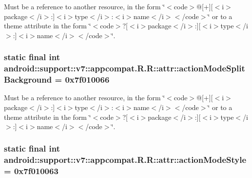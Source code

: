 Must be a reference to another resource, in the form \char`\"{}$<$code$>$@\mbox{[}+\mbox{]}\mbox{[}$<$i$>$package$<$/i$>$:\mbox{]}$<$i$>$type$<$/i$>$:$<$i$>$name$<$/i$>$$<$/code$>$\char`\"{} or to a theme attribute in the form \char`\"{}$<$code$>$?\mbox{[}$<$i$>$package$<$/i$>$:\mbox{]}\mbox{[}$<$i$>$type$<$/i$>$:\mbox{]}$<$i$>$name$<$/i$>$$<$/code$>$\char`\"{}. \hypertarget{classandroid_1_1support_1_1v7_1_1appcompat_1_1_r_1_1attr_db187c15298c9c64fd1d8e275b231a8e}{
\subsubsection[{actionModeSplitBackground}]{\setlength{\rightskip}{0pt plus 5cm}static final int android::support::v7::appcompat.R.R::attr::actionModeSplitBackground = 0x7f010066}}
\label{classandroid_1_1support_1_1v7_1_1appcompat_1_1_r_1_1attr_db187c15298c9c64fd1d8e275b231a8e}


Must be a reference to another resource, in the form \char`\"{}$<$code$>$@\mbox{[}+\mbox{]}\mbox{[}$<$i$>$package$<$/i$>$:\mbox{]}$<$i$>$type$<$/i$>$:$<$i$>$name$<$/i$>$$<$/code$>$\char`\"{} or to a theme attribute in the form \char`\"{}$<$code$>$?\mbox{[}$<$i$>$package$<$/i$>$:\mbox{]}\mbox{[}$<$i$>$type$<$/i$>$:\mbox{]}$<$i$>$name$<$/i$>$$<$/code$>$\char`\"{}. \hypertarget{classandroid_1_1support_1_1v7_1_1appcompat_1_1_r_1_1attr_74c4d5e912157068ec57c3e16d855f80}{
\subsubsection[{actionModeStyle}]{\setlength{\rightskip}{0pt plus 5cm}static final int android::support::v7::appcompat.R.R::attr::actionModeStyle = 0x7f010063}}
\label{classandroid_1_1support_1_1v7_1_1appcompat_1_1_r_1_1attr_74c4d5e912157068ec57c3e16d855f80}


